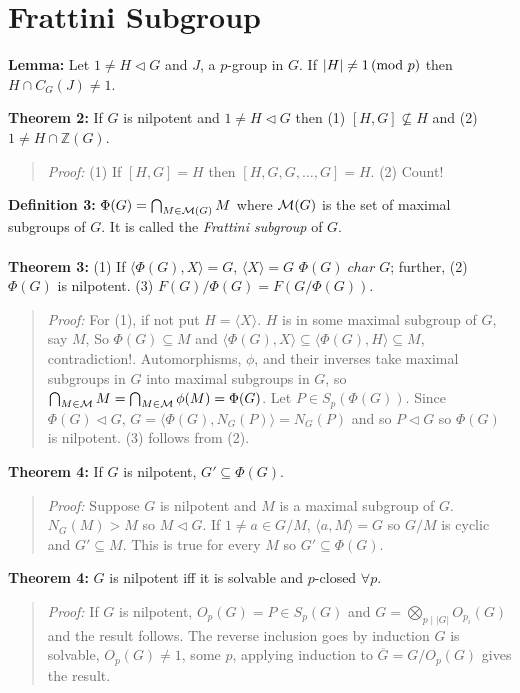 \section{Frattini Subgroup}
{\bf Lemma:} Let $1 \ne H \lhd G$ and $J$, a $p$-group in $G$.  If $|H| \neq 1 \thinspace \textnormal{(mod } p \textnormal{)}$ then
$H \cap C_G(J) \neq 1$.
\begin{quote}
\end{quote}
{\bf Theorem 2:} If $G$ is nilpotent and $1 \ne H \lhd G$ then (1) $[H,G] \nsubseteq H$ and
(2) $1 \ne H \cap {\mathbb Z}(G)$.
\begin{quote}
\emph{Proof:} (1) If $[H,G]=H$ then $[H, G, G, \ldots, G]=H$. (2) Count!
\end{quote}
{\bf Definition 3:} $\Phi(G)= \bigcap_{M \in {\cal M}(G)} M$ where ${\cal M}(G)$ is the set of
maximal subgroups of $G$.  
It is called the \emph {Frattini subgroup} of $G$.  
\\
\\
{\bf Theorem 3:} 
(1) If $\langle \Phi(G), X \rangle = G$, $\langle X \rangle = G$
$\Phi(G) \; char \; G$; further,
(2) $\Phi(G)$ is nilpotent. (3)
$F(G)/\Phi(G)= F(G/\Phi(G))$.
\begin{quote}
\emph{Proof:}  
For (1), if not put $H=\langle X \rangle$.  $H$ is in some maximal subgroup of $G$, say $M$,
So $\Phi(G) \subseteq M$ and $\langle \Phi(G), X \rangle \subseteq \langle \Phi(G), H \rangle \subseteq M$,
contradiction!.
Automorphisms, $\phi$, and their inverses take maximal subgroups in $G$ into
maximal subgroups in $G$, so 
$ \bigcap_{M \in {\cal M}} M = \bigcap_{M \in {\cal M}} \phi(M)= \Phi(G)$.
Let $P \in S_p(\Phi(G))$.  Since $\Phi(G) \lhd G$, $G= \langle \Phi(G), N_G(P) \rangle = N_G(P)$ and so
$P \lhd G$ so $\Phi(G)$ is nilpotent.  (3) follows from (2).
\end{quote}
{\bf Theorem 4:} If $G$ is nilpotent, $G' \subseteq \Phi(G)$.
\begin{quote}
\emph{Proof:}  Suppose $G$ is nilpotent and $M$ is a maximal subgroup of $G$.
$N_G(M)>M$ so $M \lhd G$.  If $1 \ne a \in G/M$, $ \langle a, M \rangle = G$ so $G/M$ is cyclic and
$G' \subseteq M$.  This is true for every $M$ so $G' \subseteq \Phi(G)$.
\end{quote}
{\bf Theorem 4:} $G$ is nilpotent iff it is solvable and $p$-closed $\forall p$.
\begin{quote}
\emph{Proof:} If $G$ is nilpotent, $O_p(G) = P \in S_p(G)$ and $G= \bigotimes_{p \mid |G|} O_{p_i}(G)$ and the result follows.
The reverse inclusion goes by induction $G$ is solvable, $O_p(G) \neq 1$, some $p$, applying induction to ${\overline G}=
G/O_p(G)$ gives the result.
\end{quote}
